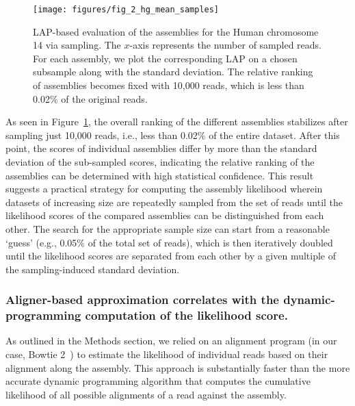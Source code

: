 \documentclass[12pt,\mydriver]{thesis}
\begin{document}
\begin{figure}[h!]
\begin{center}
\texttt{[image: figures/fig\_2\_hg\_mean\_samples]}
\end{center}
\renewcommand{\baselinestretch}{1}
\small\normalsize
\begin{quote}
\caption[LAP-based evaluation of the assemblies for the Human
  chromosome 14 via sampling.]{LAP-based evaluation of the assemblies for the Human
    chromosome 14 via sampling.
  The $x$-axis represents the number of
  sampled reads.  For each assembly, we plot the corresponding LAP
  on a chosen subsample along with the standard deviation.  The relative
  ranking of assemblies becomes fixed with 10,000 reads, which is
  less than 0.02\% of the original reads.}
\label{hg_mean_samples}
\end{quote}
\end{figure}
\renewcommand{\baselinestretch}{2}
\small\normalsize

As seen in Figure~\ref{hg_mean_samples}, the overall ranking of the
different assemblies stabilizes after sampling just
10,000 reads, i.e., less than 0.02\% of the entire dataset. After
this point, the scores of individual assemblies differ by more than
the standard deviation of the sub-sampled scores, indicating the relative
ranking of the assemblies can be determined with high statistical
confidence. This result suggests a practical strategy for computing
the assembly likelihood wherein datasets of increasing size are
repeatedly sampled from the set of reads until the likelihood scores
of the compared assemblies can be distinguished from each
other. The search for the appropriate sample size can start from a
reasonable `guess' (e.g., 0.05\% of the total set of reads), which is
then iteratively doubled until the likelihood scores are separated from
each other by a given multiple of the sampling-induced standard deviation.

\subsubsection{Aligner-based approximation correlates with the
  dynamic-programming computation of the likelihood score.} As outlined in
the Methods section, we relied on an alignment program (in our case,
Bowtie 2~\cite{langmead2012fast}) to estimate the likelihood of individual reads
based on their alignment along the assembly.  This approach is
substantially faster than the more accurate dynamic programming
algorithm that computes the cumulative likelihood of all possible
alignments of a read against the assembly.
\end{document}
